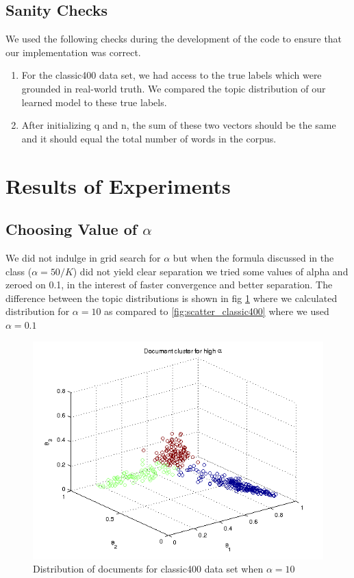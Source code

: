 \documentclass[11pt,a4paper,oneside]{article}
\begin{document}
\subsection{Sanity Checks}
We used the following checks during the development of the code to ensure that our implementation was correct.
\begin{enumerate}
\item For the classic400 data set, we had access to the true labels which were grounded in real-world truth. We compared the topic distribution of our learned model to these true labels. 
\item After initializing q and n, the sum of these two vectors should be the same and it should equal the total number of words in the corpus.
\end{enumerate}

\newpage
\section{Results of Experiments}
\label{sec:Results}
\subsection{Choosing Value of $\alpha$}
We did not indulge in grid search for $\alpha$ but when the formula discussed in the class ($\alpha = 50/K$) did not yield clear separation we tried some values of alpha and zeroed on 0.1, in the interest of faster convergence and better separation. The difference between the topic distributions is shown in fig \ref{fig:classic400_high_alpha} where we calculated distribution for $\alpha = 10$ as compared to \ref{fig:scatter_classic400} where we used $\alpha = 0.1$

\begin{figure}[H]
\centering
\includegraphics[width=\columnwidth]{high_alpha}
\caption{Distribution of documents for classic400 data set when $\alpha = 10$}
\label{fig:classic400_high_alpha}
\end{figure}
\end{document}
